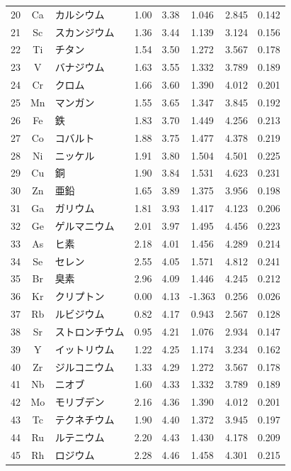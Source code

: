 \documentclass[11pt,a4paper]{article}
\begin{document}
\begin{longtable}{|c|c|p{2.5cm}|c|c|c|c|c|}
			20 & Ca & カルシウム & 1.00 & 3.38 & 1.046 & 2.845 & 0.142 \\
			21 & Sc & スカンジウム & 1.36 & 3.44 & 1.139 & 3.124 & 0.156 \\
			22 & Ti & チタン & 1.54 & 3.50 & 1.272 & 3.567 & 0.178 \\
			23 & V & バナジウム & 1.63 & 3.55 & 1.332 & 3.789 & 0.189 \\
			24 & Cr & クロム & 1.66 & 3.60 & 1.390 & 4.012 & 0.201 \\
			25 & Mn & マンガン & 1.55 & 3.65 & 1.347 & 3.845 & 0.192 \\
			26 & Fe & 鉄 & 1.83 & 3.70 & 1.449 & 4.256 & 0.213 \\
			27 & Co & コバルト & 1.88 & 3.75 & 1.477 & 4.378 & 0.219 \\
			28 & Ni & ニッケル & 1.91 & 3.80 & 1.504 & 4.501 & 0.225 \\
			29 & Cu & 銅 & 1.90 & 3.84 & 1.531 & 4.623 & 0.231 \\
			30 & Zn & 亜鉛 & 1.65 & 3.89 & 1.375 & 3.956 & 0.198 \\
			31 & Ga & ガリウム & 1.81 & 3.93 & 1.417 & 4.123 & 0.206 \\
			32 & Ge & ゲルマニウム & 2.01 & 3.97 & 1.495 & 4.456 & 0.223 \\
			33 & As & ヒ素 & 2.18 & 4.01 & 1.456 & 4.289 & 0.214 \\
			34 & Se & セレン & 2.55 & 4.05 & 1.571 & 4.812 & 0.241 \\
			35 & Br & 臭素 & 2.96 & 4.09 & 1.446 & 4.245 & 0.212 \\
			36 & Kr & クリプトン & 0.00 & 4.13 & -1.363 & 0.256 & 0.026 \\
			37 & Rb & ルビジウム & 0.82 & 4.17 & 0.943 & 2.567 & 0.128 \\
			38 & Sr & ストロンチウム & 0.95 & 4.21 & 1.076 & 2.934 & 0.147 \\
			39 & Y & イットリウム & 1.22 & 4.25 & 1.174 & 3.234 & 0.162 \\
			40 & Zr & ジルコニウム & 1.33 & 4.29 & 1.272 & 3.567 & 0.178 \\
			41 & Nb & ニオブ & 1.60 & 4.33 & 1.332 & 3.789 & 0.189 \\
			42 & Mo & モリブデン & 2.16 & 4.36 & 1.390 & 4.012 & 0.201 \\
			43 & Tc & テクネチウム & 1.90 & 4.40 & 1.372 & 3.945 & 0.197 \\
			44 & Ru & ルテニウム & 2.20 & 4.43 & 1.430 & 4.178 & 0.209 \\
			45 & Rh & ロジウム & 2.28 & 4.46 & 1.458 & 4.301 & 0.215 \\

\end{longtable}
\end{document}
